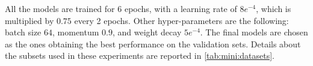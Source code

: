 All the models are trained for 6 epochs, with a learning rate of $8e^{-4}$, which is multiplied by $0.75$ every 2 epochs.
Other hyper-parameters are the following: batch size $64$, momentum $0.9$, and weight decay $5e^{-4}$.
The final models are chosen as the ones obtaining the best performance on the validation sets.
Details about the subsets used in these experiments are reported in \ref{tab:mini:datasets}.





